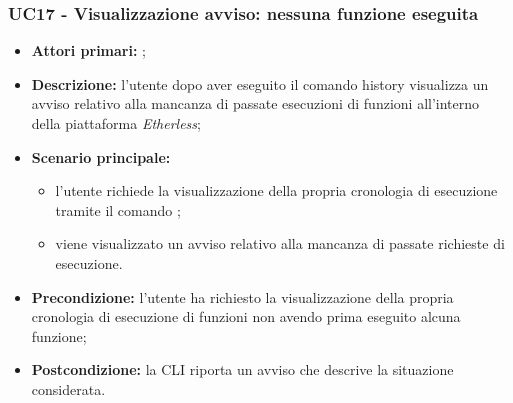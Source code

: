 \subsubsection{UC17 - Visualizzazione avviso: nessuna funzione eseguita}
\begin{itemize}
	\item \textbf{Attori primari:} \us{};
	\item \textbf{Descrizione:} l’utente dopo aver eseguito il comando history visualizza un avviso relativo alla mancanza di passate esecuzioni di funzioni all’interno della piattaforma \textit{Etherless};
	\item \textbf{Scenario principale:} 
	\begin{itemize}
		\item l’utente richiede la visualizzazione della propria cronologia di esecuzione tramite il comando \history{};
		\item viene visualizzato un avviso relativo alla mancanza di passate richieste di esecuzione.
	\end{itemize}
	\item \textbf{Precondizione:}  l’utente ha richiesto la visualizzazione della propria cronologia di esecuzione di funzioni non avendo prima eseguito alcuna funzione;
	\item \textbf{Postcondizione:} la CLI riporta un avviso che descrive la situazione considerata.  
\end{itemize}